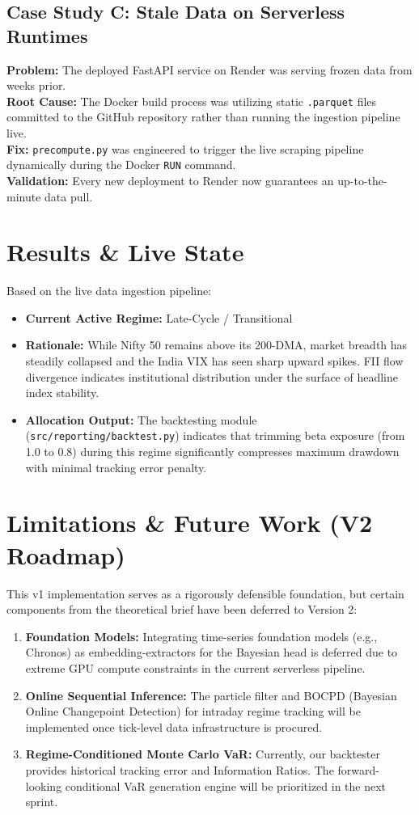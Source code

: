 \documentclass[11pt,a4paper]{article}
\begin{document}
\subsection{Case Study C: Stale Data on Serverless Runtimes}
\textbf{Problem:} The deployed FastAPI service on Render was serving frozen data from weeks prior.\\
\textbf{Root Cause:} The Docker build process was utilizing static \texttt{.parquet} files committed to the GitHub repository rather than running the ingestion pipeline live.\\
\textbf{Fix:} \texttt{precompute.py} was engineered to trigger the live scraping pipeline dynamically during the Docker \texttt{RUN} command.\\
\textbf{Validation:} Every new deployment to Render now guarantees an up-to-the-minute data pull.

\section{Results \& Live State}
Based on the live data ingestion pipeline:
\begin{itemize}
    \item \textbf{Current Active Regime:} Late-Cycle / Transitional
    \item \textbf{Rationale:} While Nifty 50 remains above its 200-DMA, market breadth has steadily collapsed and the India VIX has seen sharp upward spikes. FII flow divergence indicates institutional distribution under the surface of headline index stability. 
    \item \textbf{Allocation Output:} The backtesting module (\texttt{src/reporting/backtest.py}) indicates that trimming beta exposure (from 1.0 to 0.8) during this regime significantly compresses maximum drawdown with minimal tracking error penalty.
\end{itemize}

\section{Limitations \& Future Work (V2 Roadmap)}
This v1 implementation serves as a rigorously defensible foundation, but certain components from the theoretical brief have been deferred to Version 2:
\begin{enumerate}
    \item \textbf{Foundation Models:} Integrating time-series foundation models (e.g., Chronos) as embedding-extractors for the Bayesian head is deferred due to extreme GPU compute constraints in the current serverless pipeline.
    \item \textbf{Online Sequential Inference:} The particle filter and BOCPD (Bayesian Online Changepoint Detection) for intraday regime tracking will be implemented once tick-level data infrastructure is procured.
    \item \textbf{Regime-Conditioned Monte Carlo VaR:} Currently, our backtester provides historical tracking error and Information Ratios. The forward-looking conditional VaR generation engine will be prioritized in the next sprint.
\end{enumerate}
\end{document}
